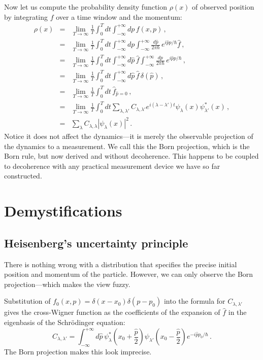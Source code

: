 \documentclass[prb,preprint]{revtex4-1}
\begin{document}
Now let us compute the probability density function $\rho(x)$ of observed position by integrating $f$ over a time window and the momentum:
\begin{eqnarray}
\rho(x) &=& \lim_{T\to\infty} \frac{1}{T} \int_0^T dt \int_{-\infty}^{+\infty} dp \, f(x,p) \,, \label{eq:born-1}\\
&=& \lim_{T\to\infty} \frac{1}{T} \int_0^T dt \int_{-\infty}^{+\infty} dp \int_{-\infty}^{+\infty} \frac{d\hat{p}}{2\pi \hbar} \, e^{i\hat{p}p/\hbar} \hat{f} \,, \label{eq:born-2}\\
&=& \lim_{T\to\infty} \frac{1}{T} \int_0^T dt \int_{-\infty}^{+\infty} d\hat{p} \, \hat{f} \int_{-\infty}^{+\infty} \frac{dp}{2\pi \hbar} \, e^{i\hat{p}p/\hbar} \,, \label{eq:born-3}\\
&=& \lim_{T\to\infty} \frac{1}{T} \int_0^T dt \int_{-\infty}^{+\infty} d\hat{p} \, \hat{f}\,\delta(\hat{p}) \,, \label{eq:born-4}\\
&=& \lim_{T\to\infty} \frac{1}{T} \int_0^T dt \, \hat{f}_{\hat{p}=0} \,, \label{eq:born-5}\\
&=& \lim_{T\to\infty} \frac{1}{T} \int_0^T dt \sum_{\lambda,\lambda'} C_{\lambda,\lambda'} e^{i (\lambda-\lambda')t}\psi_\lambda(x)\psi_{\lambda'}^*(x) \,, \label{eq:born-6}\\
&=& \sum_\lambda C_{\lambda,\lambda} |\psi_\lambda(x)|^2 \,. \label{eq:born-rule}
\end{eqnarray}
Notice it does not affect the dynamics---it is merely the observable projection of the dynamics
to a measurement.  We call this the Born projection, which is the Born rule, but now derived
and without decoherence.\cite{zurek2003}  This happens to be coupled to decoherence with any practical
measurement device we have so far constructed.


\section{Demystifications}

\subsection{Heisenberg's uncertainty principle}

There is nothing wrong with a distribution that specifies the precise initial position and
momentum of the particle.  However, we can only observe the Born projection---which makes
the view fuzzy.

Substitution of $f_0(x,p)=\delta(x-x_0)\delta(p-p_0)$ into the formula for $C_{\lambda,\lambda'}$
gives the cross-Wigner function as the coefficients of the expansion of $\hat{f}$ in the
eigenbasis of the Schr\"odinger equation:
\begin{equation}\label{eq:cross-wigner}
C_{\lambda,\lambda'} = \int_{-\infty}^{+\infty} d\hat{p} \, \psi_\lambda^*\!\left(x_0+\frac{\hat{p}}{2}\right) \psi_{\lambda'}\!\left(x_0-\frac{\hat{p}}{2}\right) e^{-i\hat{p}p_0/\hbar}\,.
\end{equation}
The Born projection makes this look imprecise.
\end{document}
